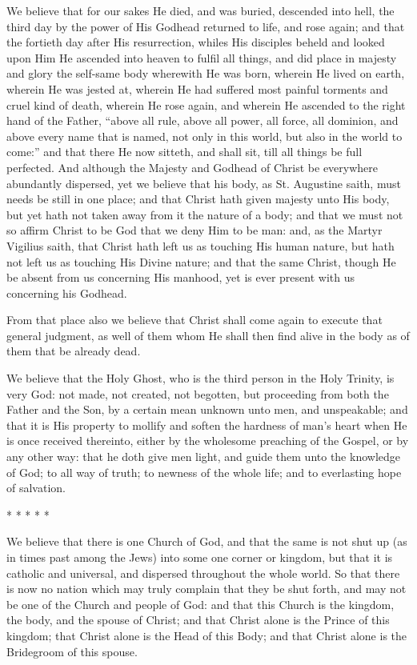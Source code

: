 We believe that for our sakes He died, and was buried, descended
into hell, the third day by the power of His Godhead returned to life,
and rose again; and that the fortieth day after His resurrection, whiles
His disciples beheld and looked upon Him He ascended into heaven to
fulfil all things, and did place in majesty and glory the self-same
body wherewith He was born, wherein He lived on earth, wherein He was
jested at, wherein He had suffered most painful torments and cruel kind
of death, wherein He rose again, and wherein He ascended to the right
hand of the Father, “above all rule, above all power, all force,
all dominion, and
above every name that is named, not only in this world, but also in
the world to come:” and that there He now sitteth, and shall sit,
till all things be full perfected. And although the Majesty and
Godhead of Christ be everywhere abundantly dispersed, yet we believe
that his body, as St. Augustine saith, must needs be still in one place;
and that Christ hath given majesty unto His body, but yet hath not taken
away from it the nature of a body; and that we must not so affirm Christ
to be God that we deny Him to be man: and, as the Martyr Vigilius saith,
that Christ hath left us as touching His human nature, but hath not
left us as touching His Divine nature; and that the same Christ, though
He be absent from us concerning His manhood, yet is ever present with
us concerning his Godhead.

From that place also we believe that Christ shall come again to execute
that general judgment, as well of them whom He shall then find alive
in the body as of them that be already dead.

We believe that the Holy Ghost, who is the third person in the Holy
Trinity, is very God: not made, not created, not begotten, but proceeding
from both the Father and the Son, by a certain mean unknown unto men,
and unspeakable; and that it is His property to mollify and soften the
hardness
of man’s heart when He is once received thereinto, either by the
wholesome preaching of the Gospel, or by any other way: that he doth
give men light, and guide them unto the knowledge of God; to all way
of truth; to newness of the whole life; and to everlasting hope of salvation.

* * * * *

We believe that there is one Church of God, and that the same is
not shut up (as in times past among the Jews) into some one corner or
kingdom, but that it is catholic and universal, and dispersed throughout
the whole world. So that there is now no nation which may truly
complain that they be shut forth, and may not be one of the Church and
people of God: and that this Church is the kingdom, the body, and the
spouse of Christ; and that Christ alone is the Prince of this kingdom;
that Christ alone is the Head of this Body; and that Christ alone is
the Bridegroom of this spouse.

